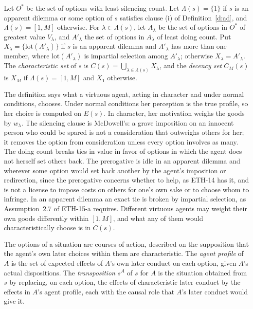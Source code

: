 \documentclass{situationist-preprint}
\newcommand{\Ch}{C}
\newcommand{\lot}{\mathrm{lot}}
\begin{document}
\begin{definition}\label{d:char}
Let $O^\ast$ be the set of options with least silencing count. Let $\Lambda(s)=\{1\}$ if $s$ is an apparent dilemma or some option of $s$ satisfies clause (i) of Definition~\ref{d:ad}, and $\Lambda(s)=[1,M]$ otherwise. For $\lambda\in\Lambda(s)$, let $A_\lambda$ be the set of options in $O^\ast$ of greatest value $V_\lambda$, and $A'_\lambda$ the set of options in $A_\lambda$ of least doing count. Put $X_\lambda=\{\lot(A'_\lambda)\}$ if $s$ is an apparent dilemma and $A'_\lambda$ has more than one member, where $\lot(A'_\lambda)$ is impartial selection among $A'_\lambda$; otherwise $X_\lambda=A'_\lambda$. The \emph{characteristic set} of $s$ is $\Ch(s)=\bigcup_{\lambda\in\Lambda(s)}X_\lambda$, and the \emph{decency set} $\Ch_M(s)$ is $X_M$ if $\Lambda(s)=[1,M]$ and $X_1$ otherwise.
\end{definition}

The definition says what a virtuous agent, acting in character and under normal conditions, chooses. Under normal conditions her perception is the true profile, so her choice is computed on $E(s)$. In character, her motivation weighs the goods by $w_\lambda$. The silencing clause is McDowell's: a grave imposition on an innocent person who could be spared is not a consideration that outweighs others for her; it removes the option from consideration unless every option involves as many. The doing count breaks ties in value in favor of options in which the agent does not herself set others back. The prerogative is idle in an apparent dilemma and wherever some option would set back another by the agent's imposition or redirection, since the prerogative concerns whether to help, as ETH-14 has it, and is not a license to impose costs on others for one's own sake or to choose whom to infringe. In an apparent dilemma an exact tie is broken by impartial selection, as Assumption~2.7 of ETH-15-a requires. Different virtuous agents may weight their own goods differently within $[1,M]$, and what any of them would characteristically choose is in $\Ch(s)$.

\begin{definition}[Transposition]\label{d:transp}
The options of a situation are courses of action, described on the supposition that the agent's own later choices within them are characteristic. The \emph{agent profile} of $A$ is the set of expected effects of $A$'s own later conduct on each option, given $A$'s actual dispositions. The \emph{transposition} $s^A$ of $s$ for $A$ is the situation obtained from $s$ by replacing, on each option, the effects of characteristic later conduct by the effects in $A$'s agent profile, each with the causal role that $A$'s later conduct would give it.
\end{definition}
\end{document}
